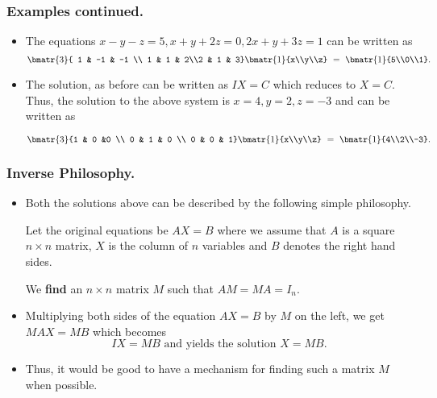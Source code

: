 \begin{frame}%
  \frametitle{Examples continued.}
  \begin{itemize}%
  
\item %
The equations $x-y-z=5,x+y+2z =0 ,2x+y+3z =1$ can be written as
$$\bmatr{3}{ 1 & -1 & -1 \\ 1 & 1 & 2\\2 & 1 & 3}\bmatr{1}{x\\y\\z}
~=~ \bmatr{1}{5\\0\\1}.$$
\item The solution, as before can be written as $IX=C$ which
reduces to $X=C$.
Thus, the solution to the above system is $x=4, y=2, z=-3$ and can be
written as

$$\bmatr{3}{1 & 0 &0 \\ 0 & 1 & 0 \\ 0 & 0 & 1}\bmatr{1}{x\\y\\z}
 ~=~\bmatr{1}{4\\2\\-3}.$$
 





\end{itemize}
\end{frame}



\begin{frame}%
  \frametitle{Inverse Philosophy.}
  \begin{itemize}%
\item Both the solutions above can be described by the following simple
philosophy. 

Let the original equations be $AX=B$ where we assume that $A$ is a
square $n\times n$ matrix, $X$ is the column of $n$ variables and $B$
denotes the right hand sides.

We {\bf find} an $n\times n$ matrix $M$ such that $AM=MA=I_n$.
\item 
 Multiplying both sides of the equation $AX=B$ by $M$ on the left, we get
$MAX=MB$  which becomes
$$IX=MB \mbox{ and yields the solution } X=MB.$$


\item Thus, it would be good to have a mechanism for finding  such a
matrix $M$ when possible.


\end{itemize}

\end{frame}  

